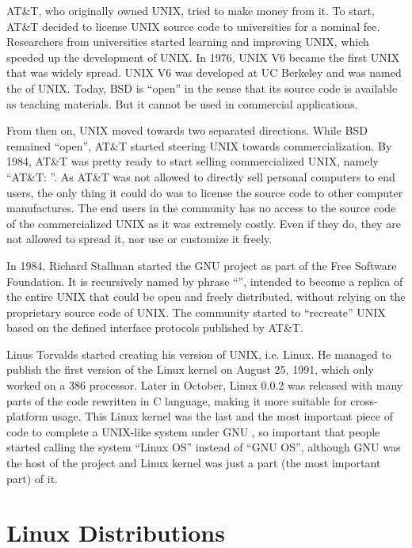 AT\&T, who originally owned UNIX, tried to make money from it. To start, AT\&T decided to license UNIX source code to universities for a nominal fee. Researchers from universities started learning and improving UNIX, which speeded up the development of UNIX. In 1976, UNIX V6 became the first UNIX that was widely spread. UNIX V6 was developed at UC Berkeley and was named the  of UNIX. Today, BSD is ``open'' in the sense that its source code is available as teaching materials. But it cannot be used in commercial applications.

From then on, UNIX moved towards two separated directions. While BSD remained ``open'', AT\&T started steering UNIX towards commercialization. By 1984, AT\&T was pretty ready to start selling commercialized UNIX, namely ``AT\&T: ''. As AT\&T was not allowed to directly sell personal computers to end users, the only thing it could do was to license the source code to other computer manufactures. The end users in the community has no access to the source code of the commercialized UNIX as it was extremely costly. Even if they do, they are not allowed to spread it, nor use or customize it freely.

In 1984, Richard Stallman started the GNU project as part of the Free Software Foundation. It is recursively named by phrase ``'', intended to become a replica of the entire UNIX that could be open and freely distributed, without relying on the proprietary source code of UNIX. The community started to ``recreate'' UNIX based on the defined interface protocols published by AT\&T.

Linus Torvalds started creating his version of UNIX, i.e. Linux. He managed to publish the first version of the Linux kernel on August 25, 1991, which only worked on a 386 processor. Later in October, Linux 0.0.2 was released with many parts of the code rewritten in C language, making it more suitable for cross-platform usage. This Linux kernel was the last and the most important piece of code to complete a UNIX-like system under GNU , so important that people started calling the system ``Linux OS'' instead of ``GNU OS'', although GNU was the host of the project and Linux kernel was just a part (the most important part) of it.

\section{Linux Distributions}

